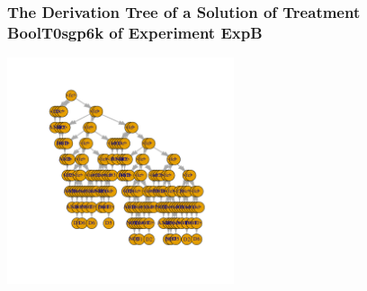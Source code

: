  \begin{frame}
 \frametitle{ The Derivation Tree of a Solution of Treatment BoolT0sgp6k of Experiment ExpB }
 \begin{center}
\includegraphics[width=0.5\textwidth, angle=0]
{ExpBDerivationTreeFigure004.pdf}
 \end{center}
 \label{report/ExpBDerivationTreeFigure004.pdf}  
 \end{frame}

